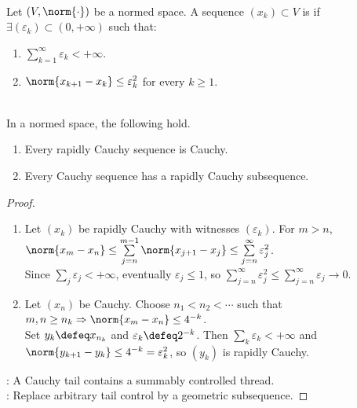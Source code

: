 \begin{definition} \label{def:rapidly-cauchy-sequence} \\
Let $(V,\norm{\cdot})$ be a normed space. A sequence $(x_k)\subset V$ is  if $\exists(\varepsilon_k)\subset(0,+\infty)$ such that:
\begin{enumerate}[label=(\roman*)]
\setlength{\itemsep}{0pt}
\item $\sum\limits_{k=1}^{\infty}\varepsilon_k<+\infty$.
\item $\norm{x_{k+1}-x_k}\leq\varepsilon_k^2$ for every $k\geq1$.
\end{enumerate}
\end{definition}

\begin{proposition} \label{prop:rapidly-cauchy-subsequence-extraction} \\
In a normed space, the following hold.
\begin{enumerate}[label=(\roman*)]
\setlength{\itemsep}{0pt}
\item Every rapidly Cauchy sequence is Cauchy.
\item Every Cauchy sequence has a rapidly Cauchy subsequence.
\end{enumerate}
\begin{proof}
\begin{enumerate}[label=(\roman*)]
\setlength{\itemsep}{0pt}
\item Let $(x_k)$ be rapidly Cauchy with witnesses $(\varepsilon_k)$. For $m>n$, $\norm{x_m-x_n}\leq\sum\limits_{j=n}^{m-1}\norm{x_{j+1}-x_j}\leq\sum\limits_{j=n}^{\infty}\varepsilon_j^2$.\\
Since $\sum_j\varepsilon_j<+\infty$, eventually $\varepsilon_j\leq1$, so $\sum\limits_{j=n}^{\infty}\varepsilon_j^2\leq\sum\limits_{j=n}^{\infty}\varepsilon_j\to0$.
\item Let $(x_n)$ be Cauchy. Choose $n_1<n_2<\cdots$ such that $m,n\geq n_k\Rightarrow\norm{x_m-x_n}\leq4^{-k}$.\\
Set $y_k\defeq x_{n_k}$ and $\varepsilon_k\defeq2^{-k}$. Then $\sum_k\varepsilon_k<+\infty$ and $\norm{y_{k+1}-y_k}\leq4^{-k}=\varepsilon_k^2$, so $(y_k)$ is rapidly Cauchy.
\end{enumerate}
: A Cauchy tail contains a summably controlled thread.\\
: Replace arbitrary tail control by a geometric subsequence.
\end{proof}
\end{proposition}

